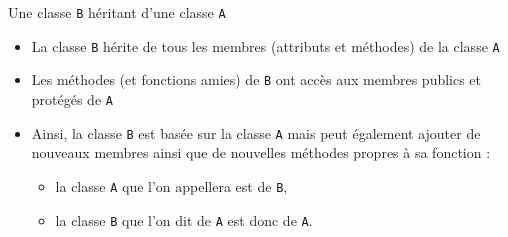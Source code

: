 \documentclass[c]{beamer}
\begin{document}
\begin{frame}[fragile]{Une classe \texttt{B} héritant d'une classe \texttt{A}}
 \begin{center}
\end{center}

\begin{itemize}
\item La classe \texttt{B} hérite de tous les membres (attributs et méthodes) de la classe \texttt{A}
\item Les méthodes (et fonctions amies) de \texttt{B} ont accès aux membres publics et protégés de \texttt{A}
\end{itemize}

\pause

\begin{itemize}
\item Ainsi, la classe \texttt{B} est basée sur la classe \texttt{A} mais peut également ajouter
de nouveaux membres ainsi que de nouvelles méthodes propres à sa fonction :

\begin{itemize}
\item la classe \texttt{A} que l'on appellera  est  de \texttt{B},

\item la classe \texttt{B} que l'on dit  de \texttt{A} est donc  de \texttt{A}.
\end{itemize}
\end{itemize}
\end{frame}


\end{document}
